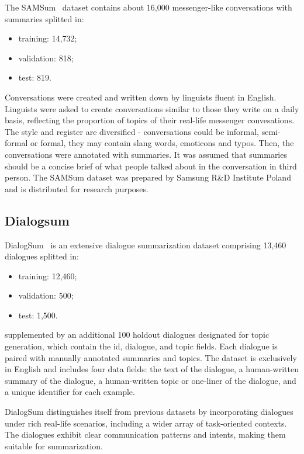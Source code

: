 \documentclass[10pt,twocolumn,letterpaper]{article}
\begin{document}
The SAMSum~\cite{DBLP:journals/corr/abs-1911-12237} dataset contains about 16,000 messenger-like conversations with summaries splitted in:
\begin{itemize}
    \item training: 14,732;
    \item validation: 818;
    \item test: 819.
\end{itemize}
Conversations were created and written down by linguists fluent in English. 
Linguists were asked to create conversations similar to those they write on a daily basis, reflecting the proportion of topics of their real-life messenger convesations. 
The style and register are diversified - conversations could be informal, semi-formal or formal, 
they may contain slang words, emoticons and typos. Then, the conversations were annotated with summaries. 
It was assumed that summaries should be a concise brief of what people talked about in the conversation in third person. 
The SAMSum dataset was prepared by Samsung R\&D Institute Poland and is distributed for research purposes.

\subsection{Dialogsum}

DialogSum~\cite{chen-etal-2021-dialogsum} is an extensive dialogue summarization dataset comprising 13,460 dialogues splitted in: 
\begin{itemize}
    \item training: 12,460;
    \item validation: 500;
    \item test: 1,500.
\end{itemize}
supplemented by an additional 100 holdout dialogues designated for topic generation, which contain the id, dialogue, and topic fields. 
Each dialogue is paired with manually annotated summaries and topics. The dataset is exclusively in English and includes four data fields: the text of the dialogue, a human-written summary of the dialogue, a human-written topic or one-liner of the dialogue, and a unique identifier for each example. 

DialogSum distinguishes itself from previous datasets by incorporating dialogues under rich real-life scenarios, including a wider array of task-oriented contexts. 
The dialogues exhibit clear communication patterns and intents, making them suitable for summarization.
\end{document}
